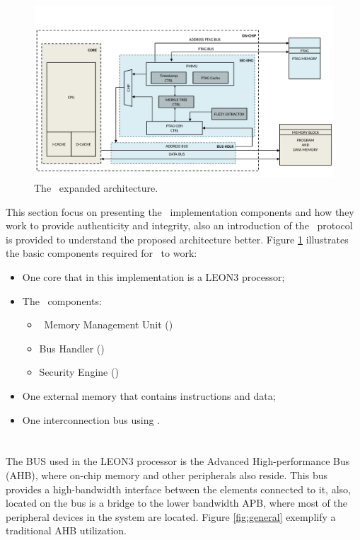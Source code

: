 \begin{figure}[!ht]
    \centering
    \includegraphics[width=\textwidth]{figures/pdf/CSHIA_detailed_caio_expansion.pdf}
    \caption{The \cshia~expanded architecture.}
    \label{fig:cshiaexpanded}
\end{figure}
 This section focus on presenting the \cshia~implementation components and how they work to provide authenticity and integrity, also an introduction of the \amba~protocol is provided to understand the proposed architecture better. Figure \ref{fig:cshiaexpanded} illustrates the basic components required for \cshia~to work: 
\begin{itemize}
    \item One core that in this implementation is a LEON3 processor;
    \item The \cshia~components:
    \begin{itemize}
        \item \ptag~Memory Management Unit (\pmmu)
        \item Bus Handler (\handler)
        \item Security Engine (\seceng) 
    \end{itemize}
    \item One external memory that contains instructions and data;
    \item One interconnection bus using \amba.
\end{itemize} 


\section{\amba}
\label{sec:amba2}


The BUS used in the LEON3 processor is the Advanced High-performance Bus (AHB), where on-chip memory and other peripherals also reside. This bus provides a high-bandwidth interface between the elements connected to it, also, located on the bus is a bridge to the lower bandwidth APB, where most of the peripheral devices in the system are located. Figure \ref{fig:general} exemplify a traditional AHB utilization.

